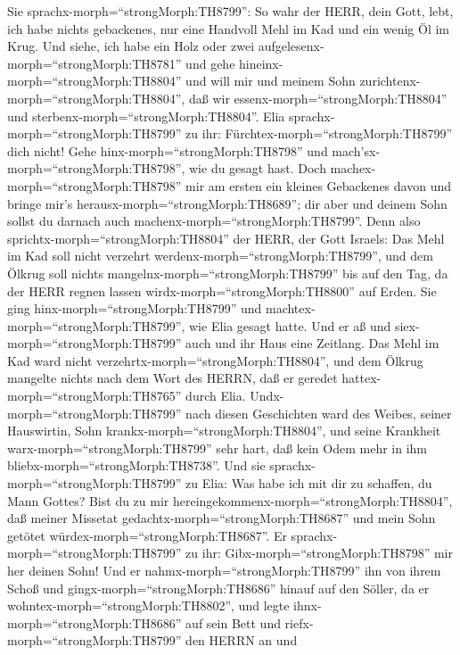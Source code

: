  Sie sprachx-morph=``strongMorph:TH8799'': So wahr der
HERR, dein Gott, lebt, ich habe nichts gebackenes, nur eine Handvoll
Mehl im Kad und ein wenig Öl im Krug. Und siehe, ich habe ein Holz oder
zwei aufgelesenx-morph=``strongMorph:TH8781'' und gehe
hineinx-morph=``strongMorph:TH8804'' und will mir und meinem Sohn
zurichtenx-morph=``strongMorph:TH8804'', daß wir
essenx-morph=``strongMorph:TH8804'' und
sterbenx-morph=``strongMorph:TH8804''.  Elia
sprachx-morph=``strongMorph:TH8799'' zu ihr:
Fürchtex-morph=``strongMorph:TH8799'' dich nicht! Gehe
hinx-morph=``strongMorph:TH8798'' und
mach'sx-morph=``strongMorph:TH8798'', wie du gesagt hast. Doch
machex-morph=``strongMorph:TH8798'' mir am ersten ein kleines Gebackenes
davon und bringe mir's herausx-morph=``strongMorph:TH8689''; dir aber
und deinem Sohn sollst du darnach auch
machenx-morph=``strongMorph:TH8799''.  Denn also
sprichtx-morph=``strongMorph:TH8804'' der HERR, der Gott Israels: Das
Mehl im Kad soll nicht verzehrt werdenx-morph=``strongMorph:TH8799'',
und dem Ölkrug soll nichts mangelnx-morph=``strongMorph:TH8799'' bis auf
den Tag, da der HERR regnen lassen wirdx-morph=``strongMorph:TH8800''
auf Erden.  Sie ging hinx-morph=``strongMorph:TH8799'' und
machtex-morph=``strongMorph:TH8799'', wie Elia gesagt hatte. Und er aß
und siex-morph=``strongMorph:TH8799'' auch und ihr Haus eine Zeitlang.
 Das Mehl im Kad ward nicht
verzehrtx-morph=``strongMorph:TH8804'', und dem Ölkrug mangelte nichts
nach dem Wort des HERRN, daß er geredet
hattex-morph=``strongMorph:TH8765'' durch Elia. 
Undx-morph=``strongMorph:TH8799'' nach diesen Geschichten ward des
Weibes, seiner Hauswirtin, Sohn krankx-morph=``strongMorph:TH8804'', und
seine Krankheit warx-morph=``strongMorph:TH8799'' sehr hart, daß kein
Odem mehr in ihm bliebx-morph=``strongMorph:TH8738''.  Und
sie sprachx-morph=``strongMorph:TH8799'' zu Elia: Was habe ich mit dir
zu schaffen, du Mann Gottes? Bist du zu mir
hereingekommenx-morph=``strongMorph:TH8804'', daß meiner Missetat
gedachtx-morph=``strongMorph:TH8687'' und mein Sohn getötet
würdex-morph=``strongMorph:TH8687''.  Er
sprachx-morph=``strongMorph:TH8799'' zu ihr:
Gibx-morph=``strongMorph:TH8798'' mir her deinen Sohn! Und er
nahmx-morph=``strongMorph:TH8799'' ihn von ihrem Schoß und
gingx-morph=``strongMorph:TH8686'' hinauf auf den Söller, da er
wohntex-morph=``strongMorph:TH8802'', und legte
ihnx-morph=``strongMorph:TH8686'' auf sein Bett  und
riefx-morph=``strongMorph:TH8799'' den HERRN an und
